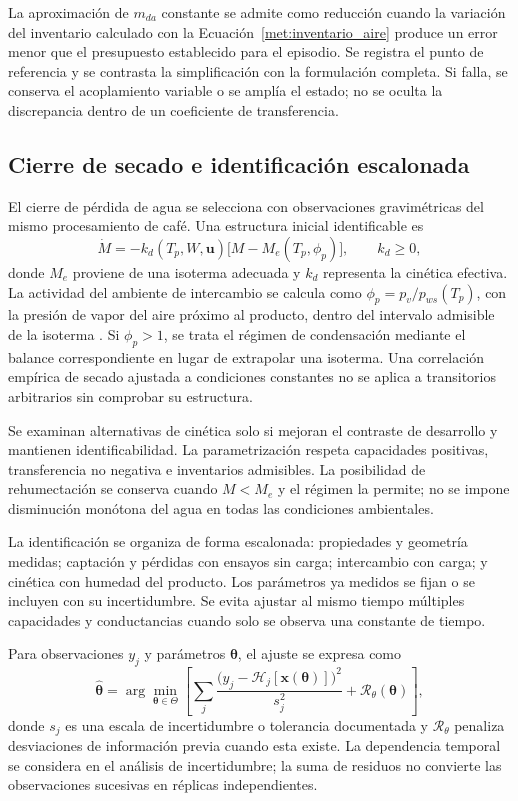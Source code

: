 La aproximación de $m_{da}$ constante se admite como reducción cuando la variación del inventario calculado con la Ecuación~\ref{met:inventario_aire} produce un error menor que el presupuesto establecido para el episodio. Se registra el punto de referencia y se contrasta la simplificación con la formulación completa. Si falla, se conserva el acoplamiento variable o se amplía el estado; no se oculta la discrepancia dentro de un coeficiente de transferencia.

\subsection{Cierre de secado e identificación escalonada}
\label{met:identificacion}

El cierre de pérdida de agua se selecciona con observaciones gravimétricas del mismo procesamiento de café. Una estructura inicial identificable es
\begin{equation}
\dot M=-k_d(T_p,W,\mathbf u)
\bigl[M-M_e(T_p,\phi_p)\bigr],
\qquad k_d\geq0,
\label{met:cierre_secado}
\end{equation}
donde $M_e$ proviene de una isoterma adecuada y $k_d$ representa la cinética efectiva. La actividad del ambiente de intercambio se calcula como $\phi_p=p_v/p_{ws}(T_p)$, con la presión de vapor del aire próximo al producto, dentro del intervalo admisible de la isoterma \cite{correa2010,timmermann2001}. Si $\phi_p>1$, se trata el régimen de condensación mediante el balance correspondiente en lugar de extrapolar una isoterma. Una correlación empírica de secado ajustada a condiciones constantes no se aplica a transitorios arbitrarios sin comprobar su estructura.

Se examinan alternativas de cinética solo si mejoran el contraste de desarrollo y mantienen identificabilidad. La parametrización respeta capacidades positivas, transferencia no negativa e inventarios admisibles. La posibilidad de rehumectación se conserva cuando $M<M_e$ y el régimen la permite; no se impone disminución monótona del agua en todas las condiciones ambientales.

La identificación se organiza de forma escalonada: propiedades y geometría medidas; captación y pérdidas con ensayos sin carga; intercambio con carga; y cinética con humedad del producto. Los parámetros ya medidos se fijan o se incluyen con su incertidumbre. Se evita ajustar al mismo tiempo múltiples capacidades y conductancias cuando solo se observa una constante de tiempo.

Para observaciones $y_j$ y parámetros $\boldsymbol\theta$, el ajuste se expresa como
\begin{equation}
\widehat{\boldsymbol\theta}
=\arg\min_{\boldsymbol\theta\in\Theta}
\left[
\sum_j
\frac{\bigl(y_j-\mathcal H_j[\mathbf x(\boldsymbol\theta)]\bigr)^2}
{s_j^2}
+\mathcal R_\theta(\boldsymbol\theta)
\right],
\label{met:ajuste_fisico}
\end{equation}
donde $s_j$ es una escala de incertidumbre o tolerancia documentada y $\mathcal R_\theta$ penaliza desviaciones de información previa cuando esta existe. La dependencia temporal se considera en el análisis de incertidumbre; la suma de residuos no convierte las observaciones sucesivas en réplicas independientes.

